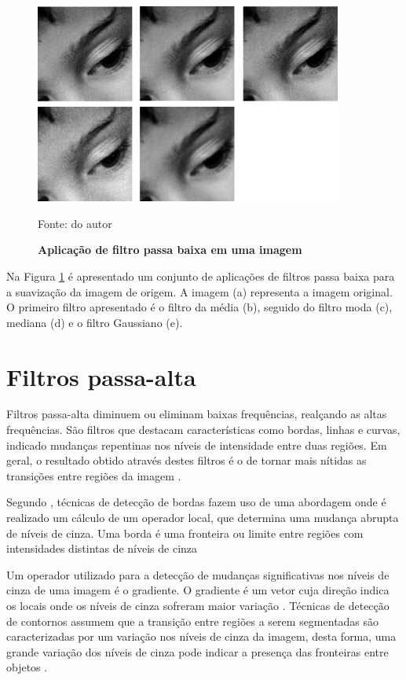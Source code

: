 \documentclass[
	12pt,				%
	oneside,			%
	a4paper,			%
	english,			%
	french,				%
	spanish,			%
	brazil,				%
	]{abntex2}
\begin{document}
\begin{figure}[ht]
\centering
\caption{\textbf{Aplicação de filtro passa baixa em uma imagem}}
\includegraphics[width=0.9\textwidth]{imagens/suavizacao.png}

Fonte: do autor
\label{fig:suavizacao}
\end{figure}

Na Figura \ref{fig:suavizacao} é apresentado um conjunto de aplicações de filtros passa baixa para a suavização da imagem de origem. A imagem (a) representa a imagem original.  O primeiro filtro apresentado é o filtro da média (b), seguido do filtro moda (c), mediana (d) e o filtro Gaussiano (e).

\section{Filtros passa-alta}

Filtros passa-alta diminuem ou eliminam baixas frequências, realçando as altas frequências. São filtros que destacam características como bordas, linhas e curvas, indicado mudanças repentinas nos níveis de intensidade entre duas regiões. Em geral, o resultado obtido através destes filtros é o de tornar mais nítidas as transições entre regiões da imagem \cite{conciAzevedoLeta:2008}.

Segundo \citet{pedriniSchwartz:2008}, técnicas de detecção de bordas fazem uso de uma abordagem onde é realizado um cálculo de um operador local, que determina uma mudança abrupta de níveis de cinza. Uma borda é uma fronteira ou limite entre regiões com intensidades distintas de níveis de cinza

Um operador utilizado para a detecção de mudanças significativas nos níveis de cinza de uma imagem é o gradiente. O gradiente é um vetor cuja direção indica os locais onde os níveis de cinza sofreram maior variação \cite{pedriniSchwartz:2008}. Técnicas de detecção de contornos assumem que a transição entre regiões a serem segmentadas são caracterizadas por um variação nos níveis de cinza da imagem, desta forma, uma grande variação dos níveis de cinza pode indicar a presença das fronteiras entre objetos \cite{conciAzevedoLeta:2008}. 
\end{document}

